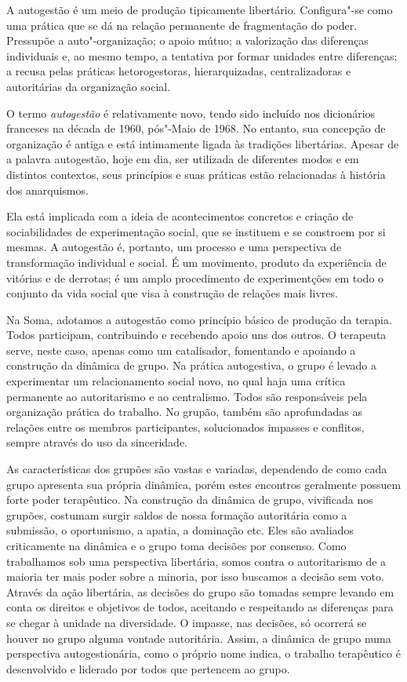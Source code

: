 A autogestão é um meio de produção tipicamente libertário. Configura"-se
como uma prática que se dá na relação permanente de fragmentação do
poder. Pressupõe a auto"-organização; o apoio mútuo; a valorização das
diferenças individuais e, ao mesmo tempo, a tentativa por formar
unidades entre diferenças; a recusa pelas práticas hetorogestoras,
hierarquizadas, centralizadoras e autoritárias da organização social.

O termo \emph{autogestão} é relativamente novo, tendo sido incluído nos
dicionários franceses na década de 1960, pós"-Maio de 1968. No entanto,
sua concepção de organização é antiga e está intimamente ligada às
tradições libertárias. Apesar de a palavra autogestão, hoje em dia, ser
utilizada de diferentes modos e em distintos contextos, seus princípios
e suas práticas estão relacionadas à história dos anarquismos.

Ela está implicada com a ideia de acontecimentos concretos e criação de
sociabilidades de experimentação social, que se instituem e se constroem
por si mesmas. A autogestão é, portanto, um processo e uma perspectiva
de transformação individual e social. É um movimento, produto da
experiência de vitórias e de derrotas; é um amplo procedimento de
experimentções em todo o conjunto da vida social que visa à construção
de relações mais livres.

Na Soma, adotamos a autogestão como princípio básico de produção da
terapia. Todos participam, contribuindo e recebendo apoio uns dos
outros. O terapeuta serve, neste caso, apenas como um catalisador,
fomentando e apoiando a construção da dinâmica de grupo. Na prática
autogestiva, o grupo é levado a experimentar um relacionamento social
novo, no qual haja uma crítica permanente ao autoritarismo e ao
centralismo. Todos são responsáveis pela organização prática do
trabalho. No grupão, também são aprofundadas as relações entre os
membros participantes, solucionados impasses e conflitos, sempre através
do uso da sinceridade.

As características dos grupões são vastas e variadas, dependendo de como
cada grupo apresenta sua própria dinâmica, porém estes encontros
geralmente possuem forte poder terapêutico. Na construção da dinâmica de
grupo, vivificada nos grupões, costumam surgir saldos de nossa formação
autoritária como a submissão, o oportunismo, a apatia, a dominação etc.
Eles são avaliados criticamente na dinâmica e o grupo toma decisões por
consenso. Como trabalhamos sob uma perspectiva libertária, somos contra
o autoritarismo de a maioria ter mais poder sobre a minoria, por isso
buscamos a decisão sem voto. Através da ação libertária, as decisões do
grupo são tomadas sempre levando em conta os direitos e objetivos de
todos, aceitando e respeitando as diferenças para se chegar à unidade na
diversidade. O impasse, nas decisões, só ocorrerá se houver no grupo
alguma vontade autoritária. Assim, a dinâmica de grupo numa perspectiva
autogestionária, como o próprio nome indica, o trabalho terapêutico é
desenvolvido e liderado por todos que pertencem ao grupo.

